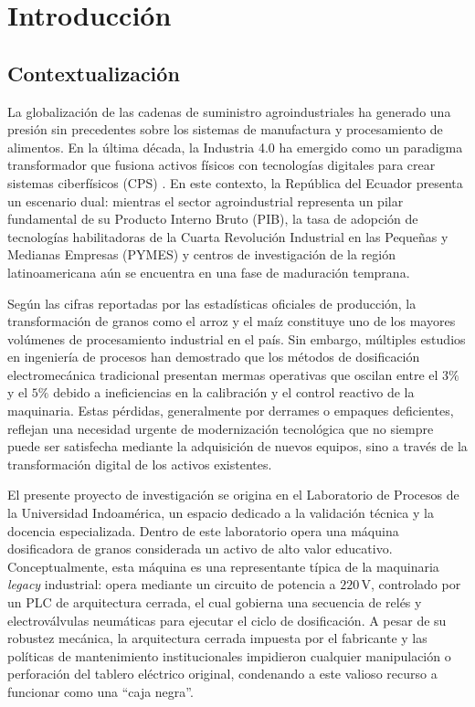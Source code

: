 \chapter{Introducción}
\label{chap:introduccion}
\section{Contextualización}
La globalización de las cadenas de suministro agroindustriales ha generado una presión sin precedentes sobre los sistemas de manufactura y procesamiento de alimentos. En la última década, la Industria 4.0 ha emergido como un paradigma transformador que fusiona activos físicos con tecnologías digitales para crear sistemas ciberfísicos (CPS) \cite{monostori2016}. En este contexto, la República del Ecuador presenta un escenario dual: mientras el sector agroindustrial representa un pilar fundamental de su Producto Interno Bruto (PIB), la tasa de adopción de tecnologías habilitadoras de la Cuarta Revolución Industrial en las Pequeñas y Medianas Empresas (PYMES) y centros de investigación de la región latinoamericana aún se encuentra en una fase de maduración temprana.

Según las cifras reportadas por las estadísticas oficiales de producción, la transformación de granos como el arroz y el maíz constituye uno de los mayores volúmenes de procesamiento industrial en el país. Sin embargo, múltiples estudios en ingeniería de procesos han demostrado que los métodos de dosificación electromecánica tradicional presentan mermas operativas que oscilan entre el $3\%$ y el $5\%$ debido a ineficiencias en la calibración y el control reactivo de la maquinaria. Estas pérdidas, generalmente por derrames o empaques deficientes, reflejan una necesidad urgente de modernización tecnológica que no siempre puede ser satisfecha mediante la adquisición de nuevos equipos, sino a través de la transformación digital de los activos existentes.

El presente proyecto de investigación se origina en el Laboratorio de Procesos de la Universidad Indoamérica, un espacio dedicado a la validación técnica y la docencia especializada. Dentro de este laboratorio opera una máquina dosificadora de granos considerada un activo de alto valor educativo. Conceptualmente, esta máquina es una representante típica de la maquinaria \textit{legacy} industrial: opera mediante un circuito de potencia a $220\,\text{V}$, controlado por un PLC de arquitectura cerrada, el cual gobierna una secuencia de relés y electroválvulas neumáticas para ejecutar el ciclo de dosificación. A pesar de su robustez mecánica, la arquitectura cerrada impuesta por el fabricante y las políticas de mantenimiento institucionales impidieron cualquier manipulación o perforación del tablero eléctrico original, condenando a este valioso recurso a funcionar como una ``caja negra''.

